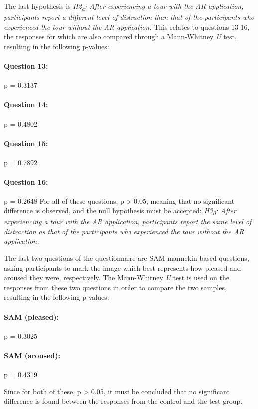 The last hypothesis is \textit{H2\textsubscript{a}: After experiencing a tour with the AR application, participants report a different level of distraction than that of the participants who experienced the tour without the AR application.} This relates to questions 13-16, the responses for which are also compared through a Mann-Whitney \textit{U} test, resulting in the following p-values:

\paragraph{Question 13:} p = 0.3137
\paragraph{Question 14:} p = 0.4802
\paragraph{Question 15:} p = 0.7892
\paragraph{Question 16:} p = 0.2648
For all of these questions, p > 0.05, meaning that no significant difference is observed, and the null hypothesis must be accepted: \textit{H3\textsubscript{0}: After experiencing a tour with the AR application, participants report the same level of distraction as that of the participants who experienced the tour without the AR application.}

The last two questions of the questionnaire are SAM-mannekin based questions, asking participants to mark the image which best represents how pleased and aroused they were, respectively. The Mann-Whitney \textit{U} test is used on the responses from these two questions in order to compare the two samples, resulting in the following p-values:

\paragraph{SAM (pleased):} p = 0.3025
\paragraph{SAM (aroused):} p = 0.4319

Since for both of these, p > 0.05, it must be concluded that no significant difference is found between the responses from the control and the test group.


